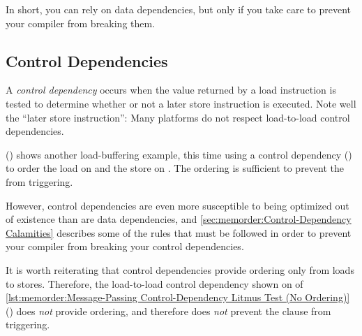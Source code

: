 In short, you can rely on data dependencies, but only if you take care
to prevent your compiler from breaking them.

\subsection{Control Dependencies}
\label{sec:memorder:Control Dependencies}

A \emph{control dependency} occurs when the value returned by a load
instruction is tested to determine whether or not a later store instruction
is executed.
Note well the ``later store instruction'': Many platforms do not respect
load-to-load control dependencies.

\begin{listing}[tbp]

\caption{Load-Buffering Control-Dependency Litmus Test}
\label{lst:memorder:Load-Buffering Control-Dependency Litmus Test}
\end{listing}

\begin{fcvref}
()
shows another load-buffering example, this time using a control
dependency () to order the load on  and the store on
.
The ordering is sufficient to prevent the  from triggering.
\end{fcvref}

However, control dependencies are even more susceptible to being optimized
out of existence than are data dependencies, and
\cref{sec:memorder:Control-Dependency Calamities}
describes some of the rules that must be followed in order to prevent
your compiler from breaking your control dependencies.

\begin{listing}[tbp]

\caption{Message-Passing Control-Dependency Litmus Test (No Ordering)}
\label{lst:memorder:Message-Passing Control-Dependency Litmus Test (No Ordering)}
\end{listing}

\begin{fcvref}
It is worth reiterating that control dependencies provide ordering only
from loads to stores.
Therefore, the load-to-load control dependency shown on  of
\cref{lst:memorder:Message-Passing Control-Dependency Litmus Test (No Ordering)}
()
does \emph{not} provide ordering, and therefore does \emph{not}
prevent the  clause from triggering.
\end{fcvref}

